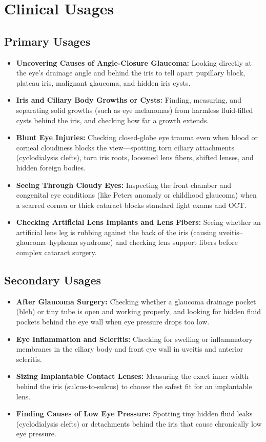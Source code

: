 \section{Clinical Usages}

\subsection{Primary Usages}

\begin{itemize}
    \item \textbf{Uncovering Causes of Angle-Closure Glaucoma:} Looking directly at the eye's drainage angle and behind the iris to tell apart pupillary block, plateau iris, malignant glaucoma, and hidden iris cysts.
    \item \textbf{Iris and Ciliary Body Growths or Cysts:} Finding, measuring, and separating solid growths (such as eye melanomas) from harmless fluid-filled cysts behind the iris, and checking how far a growth extends.
    \item \textbf{Blunt Eye Injuries:} Checking closed-globe eye trauma even when blood or corneal cloudiness blocks the view---spotting torn ciliary attachments (cyclodialysis clefts), torn iris roots, loosened lens fibers, shifted lenses, and hidden foreign bodies.
    \item \textbf{Seeing Through Cloudy Eyes:} Inspecting the front chamber and congenital eye conditions (like Peters anomaly or childhood glaucoma) when a scarred cornea or thick cataract blocks standard light exams and OCT.
    \item \textbf{Checking Artificial Lens Implants and Lens Fibers:} Seeing whether an artificial lens leg is rubbing against the back of the iris (causing uveitis--glaucoma--hyphema syndrome) and checking lens support fibers before complex cataract surgery.
\end{itemize}

\subsection{Secondary Usages}

\begin{itemize}
    \item \textbf{After Glaucoma Surgery:} Checking whether a glaucoma drainage pocket (bleb) or tiny tube is open and working properly, and looking for hidden fluid pockets behind the eye wall when eye pressure drops too low.
    \item \textbf{Eye Inflammation and Scleritis:} Checking for swelling or inflammatory membranes in the ciliary body and front eye wall in uveitis and anterior scleritis.
    \item \textbf{Sizing Implantable Contact Lenses:} Measuring the exact inner width behind the iris (sulcus-to-sulcus) to choose the safest fit for an implantable lens.
    \item \textbf{Finding Causes of Low Eye Pressure:} Spotting tiny hidden fluid leaks (cyclodialysis clefts) or detachments behind the iris that cause chronically low eye pressure.
\end{itemize}

